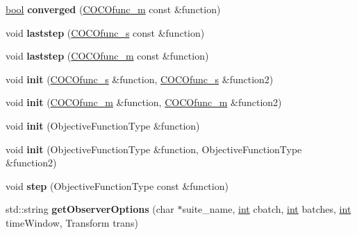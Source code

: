 \begin{DoxyCompactItemize}
\item 
\hyperlink{classbool}{bool} {\bfseries converged} (\hyperlink{classCOCOfunc__m}{C\+O\+C\+Ofunc\+\_\+m} const \&function)\hypertarget{classRandomSearch_a77837af3a9415e267795daf0a3f4d55e}{}\label{classRandomSearch_a77837af3a9415e267795daf0a3f4d55e}

\item 
void {\bfseries laststep} (\hyperlink{classCOCOfunc__s}{C\+O\+C\+Ofunc\+\_\+s} const \&function)\hypertarget{classRandomSearch_a711a6539e11446e24f5bd7b008845103}{}\label{classRandomSearch_a711a6539e11446e24f5bd7b008845103}

\item 
void {\bfseries laststep} (\hyperlink{classCOCOfunc__m}{C\+O\+C\+Ofunc\+\_\+m} const \&function)\hypertarget{classRandomSearch_ae79d33ee5df90b4bf2d51fdcfd1cf9d8}{}\label{classRandomSearch_ae79d33ee5df90b4bf2d51fdcfd1cf9d8}

\item 
void {\bfseries init} (\hyperlink{classCOCOfunc__s}{C\+O\+C\+Ofunc\+\_\+s} \&function, \hyperlink{classCOCOfunc__s}{C\+O\+C\+Ofunc\+\_\+s} \&function2)\hypertarget{classRandomSearch_ab4d3eadc92afb2a57815393ecab2ce19}{}\label{classRandomSearch_ab4d3eadc92afb2a57815393ecab2ce19}

\item 
void {\bfseries init} (\hyperlink{classCOCOfunc__m}{C\+O\+C\+Ofunc\+\_\+m} \&function, \hyperlink{classCOCOfunc__m}{C\+O\+C\+Ofunc\+\_\+m} \&function2)\hypertarget{classRandomSearch_a9359b5dc4106c0ef40d08a40ab4199d4}{}\label{classRandomSearch_a9359b5dc4106c0ef40d08a40ab4199d4}

\item 
void {\bfseries init} (Objective\+Function\+Type \&function)\hypertarget{classCocoOptimiser_a0c7df5618e3fba607b32cf77190f49cb}{}\label{classCocoOptimiser_a0c7df5618e3fba607b32cf77190f49cb}

\item 
void {\bfseries init} (Objective\+Function\+Type \&function, Objective\+Function\+Type \&function2)\hypertarget{classCocoOptimiser_af261a238b756aeda91f891ca417ebe58}{}\label{classCocoOptimiser_af261a238b756aeda91f891ca417ebe58}

\item 
void {\bfseries step} (Objective\+Function\+Type const \&function)\hypertarget{classCocoOptimiser_ae48180f04b5b40318b4c52cd02862239}{}\label{classCocoOptimiser_ae48180f04b5b40318b4c52cd02862239}

\item 
std\+::string {\bfseries get\+Observer\+Options} (char $\ast$suite\+\_\+name, \hyperlink{classint}{int} cbatch, \hyperlink{classint}{int} batches, \hyperlink{classint}{int} time\+Window, Transform trans)\hypertarget{classCocoOptimiser_ad9591d2b76f7078a956e7cdca1d8ba60}{}\label{classCocoOptimiser_ad9591d2b76f7078a956e7cdca1d8ba60}


\end{DoxyCompactItemize}
